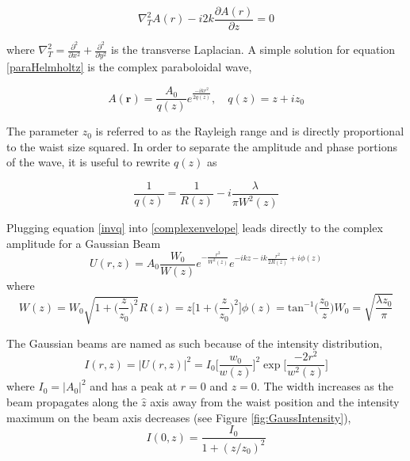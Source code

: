 		\begin{equation}\label{paraHelmholtz}
		\nabla_T^2 A(r) - i2k \frac{\partial A(r)}{\partial z} = 0
		\end{equation}
		
		where $\nabla_T^2 = \frac{\partial^2}{\partial x^2} + \frac{\partial^2}{\partial y^2} $ is the transverse Laplacian.  A simple solution for equation \ref{paraHelmholtz} is the complex paraboloidal wave,
		
		\begin{equation} \label{complexenvelope}
		A(\mathbf{r}) = \frac{A_0}{q(z)} e^{\frac{-ikr^2}{2q(z)}} , \quad q(z)=z+iz_0
		\end{equation}
		
		The parameter $z_0$ is referred to as the Rayleigh range and is directly proportional to the waist size squared.  In order to separate the amplitude and phase portions of the wave, it is useful to rewrite $q(z)$ as
		
		\begin{equation}\label{invq}
		\frac{1}{q(z)} = \frac{1}{R(z)} - i \frac{\lambda}{\pi W^2(z)}
		\end{equation} 
		
		Plugging equation \ref{invq} into \ref{complexenvelope} leads directly to the complex amplitude for a Gaussian Beam
		\begin{equation}
		U(r,z) = A_0 \frac{W_0}{W(z)} e^{-\frac{r^2}{W^2(z)}} e^{-ikz - ik \frac{r^2}{2R(z)} + i \phi(z)}
		\end{equation}
		where
		\begin{subequations}
		\begin{equation}
		W(z) = W_0 \sqrt{1 + \bigg( \frac{z}{z_0} \bigg)^2}
		\end{equation}
		\begin{equation}\label{ROC}
		R(z) = z \bigg[ 1 + \bigg( \frac{z}{z_0} \bigg)^2 \bigg]
		\end{equation}
		\begin{equation}\label{gouy}
		\phi(z)= \text{tan}^{-1}\bigg(\frac{z_0}{z}\bigg)
		\end{equation}
		\begin{equation}
		W_0 = \sqrt{\frac{\lambda z_0}{\pi}}
		\end{equation}
		\end{subequations}
	
		The Gaussian beams are named as such because of the intensity distribution,
		\begin{equation}
		I(r,z) = \vert U(r,z) |^2 = I_0 \bigg[ \frac{w_0}{w(z)}\bigg]^2 \exp \bigg[ \frac{-2 r^2}{w^2(z)}\bigg]
		\end{equation}
		where $I_0 = \vert A_0\vert^2$ and has a peak at $r=0$ and $z=0$.  The width increases as the beam propagates along the $\hat{z}$ axis away from the waist position and the intensity maximum on the beam axis decreases (see Figure \ref{fig:GaussIntensity}),
		\begin{equation}
		I(0,z) = \frac{I_0}{1 + (z/z_0)^2}
		\end{equation}
		
